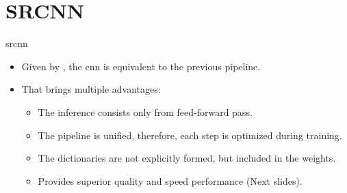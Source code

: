 \documentclass[hyperref={unicode}, xcolor=dvipsnames, t]{beamer}
\begin{document}
\section{SRCNN}
\begin{frame}{\texorpdfstring{\gls{srcnn}}{Lg}}
    \begin{itemize}
        \item Given by \textcite{srcnn}, the \gls{cnn} is \alert{equivalent} to the previous pipeline.
        \item That brings multiple advantages:
        \begin{itemize}
            \item The inference consists only from \alert{feed-forward pass}.
            \item The pipeline is unified, therefore, each step is optimized during training.
            \item The dictionaries are not explicitly formed, but included in the weights.
            \item Provides \alert{superior quality and speed performance} (Next slides).
        \end{itemize}
    \end{itemize}
\end{frame}
\end{document}
